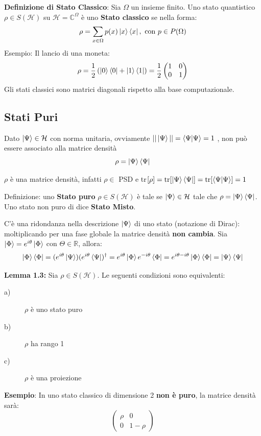 \documentclass{report}
\begin{document}
\medskip
\textbf{Definizione di Stato Classico}: Sia $\Omega$ un insieme finito. Uno stato quantistico $\rho \in S(\mathcal{H})$ su $\mathcal{H}= \mathbb{C}^\Omega$ è uno \textbf{Stato classico} se nella forma: $$\rho = \sum_{x\in \Omega}p(x)\ket{x}\bra{x}, \text{ con } p\in P(\Omega)$$
Esempio: Il lancio di una moneta: 
$$\rho = \frac{1}{2}\left( \ket{0} \bra{0}+ \ket{1}\bra{1}\right)= 
\frac{1}{2}
\begin{pmatrix}
    1 & 0\\
    0 & 1
\end{pmatrix}
$$
Gli stati classici sono matrici diagonali rispetto alla base computazionale.

\subsection{Stati Puri}
Dato $\ket{\Psi} \in \mathcal{H}$ con norma unitaria, ovviamente $||\ket{\Psi}|| = \braket{\Psi|\Psi}=1$ , non può essere associato alla matrice densità
$$\rho = \ket{\Psi} \bra{\Psi}$$

$\rho$ è una matrice densità, infatti $\rho \in$ PSD e tr$[\rho] = \text{tr}[\ket{\Psi}\bra{\Psi}]=\text{tr}[\braket{\Psi|\Psi}]=1$


Definizione: uno \textbf{Stato puro} $\rho \in S(\mathcal{H})$ è tale se $\ket{\Psi} \in \mathcal{H}$ tale che $\rho = \ket{\Psi}\bra{\Psi}$. Uno stato non puro di dice \textbf{Stato Misto}.

C'è una ridondanza nella descrizione $\ket{\Psi}$ di uno stato (notazione di Dirac): moltiplicando per una fase globale la matrice densità \textbf{non cambia}. Sia $\ket{\Phi}= e^{i\theta}\ket{ \Phi}$ con $\Theta \in \mathbb{R}$, allora:
$$\ket{\Phi}\bra{\Phi} = (e^{i\theta}\ket{\Psi})(e^{i\theta}\bra{\Psi})^{\dagger} = 
e^{i\theta}\ket{ \Phi}e^{-i\theta}\bra{\Phi} = e^{i\theta-i\theta}\ket{ \Phi}\bra{\Phi}=
\ket{\Psi} \bra{\Psi}$$

\textbf{Lemma 1.3:} Sia $\rho\in S(\mathcal{H})$. Le seguenti condizioni sono equivalenti:
\begin{description}
    \item[a)] $\rho$ è uno stato puro
    \item[b)] $\rho$ ha rango 1
    \item[c)] $\rho$ è una proiezione
\end{description}

\textbf{Esempio}: In uno stato classico di dimensione 2 \textbf{non è puro}, la matrice densità sarà:
$$
\begin{pmatrix}
	\rho & 0\\
	0 & 1 - \rho
\end{pmatrix}
$$
\end{document}
